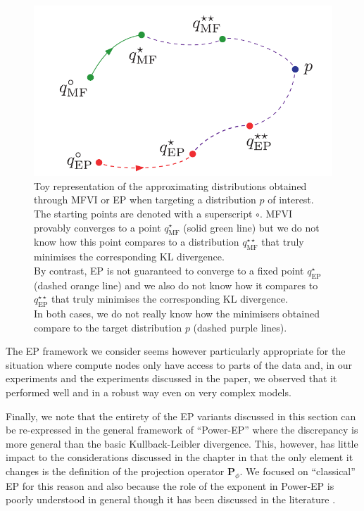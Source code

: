 \begin{figure}[!h]
\center
\includegraphics[width=.6\textwidth]{figures/general/vi-ep-space}
\vspace*{.2cm}
\caption{\label{comp-vi-ep}Toy representation of the approximating distributions obtained through MFVI or EP when targeting a distribution $p$ of interest. The starting points are denoted with a superscript $\circ$. MFVI provably converges to a point $q^{\star}_{\text{MF}}$ (solid green line) but we do not know how this point compares to a distribution $q^{\star\star}_{\text{MF}}$ that truly minimises the corresponding KL divergence.\\ By contrast, EP is not guaranteed to converge to a fixed point $q^{\star}_{\text{EP}}$ (dashed orange line) and we also do not know how it compares to $q^{\star\star}_{\text{EP}}$ that truly minimises the corresponding KL divergence. \\
In both cases, we do not really know how the minimisers obtained compare to the target distribution $p$ (dashed purple lines). }
\end{figure}

The EP framework we consider seems however particularly appropriate for the situation where compute nodes only have access to parts of the data and, in our experiments and the experiments discussed in the paper, we observed that it performed well and in a robust way even on very complex models.

Finally, we note that the entirety of the EP variants discussed in this section can be re-expressed in the general framework of ``Power-EP'' \citep{minka04} where the discrepancy is more general than the basic Kullback-Leibler divergence. This, however, has little impact to the considerations discussed in the chapter in that the only element it changes is the definition of the projection operator $\mathbf P_{\phi}$. We focused on ``classical'' EP for this reason and also because the role of the exponent in Power-EP is poorly understood in general though it has been discussed in the literature \citep{minka04, hernandez15, li16}.



